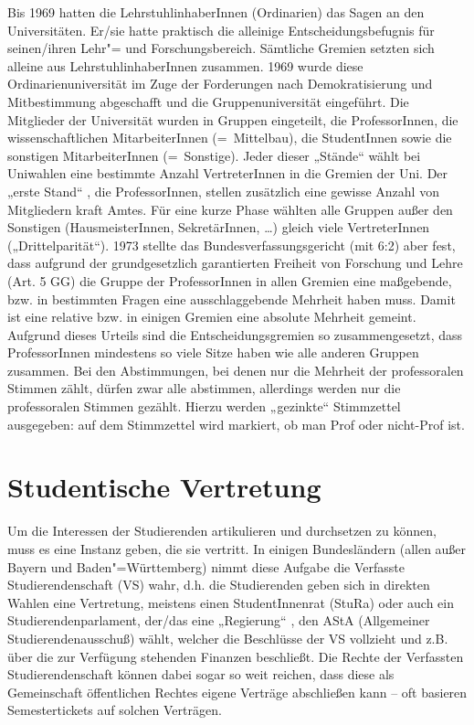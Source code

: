 Bis 1969 hatten die LehrstuhlinhaberInnen (Ordinarien) das Sagen an den
Universitäten. Er/sie hatte praktisch die alleinige Entscheidungsbefugnis
für seinen/ihren Lehr"= und Forschungsbereich. Sämtliche Gremien setzten
sich alleine aus LehrstuhlinhaberInnen zusammen. 1969 wurde diese
Ordinarienuniversität im Zuge der Forderungen nach Demokratisierung und
Mitbestimmung abgeschafft und die Gruppenuniversität eingeführt. Die
Mitglieder der Universität wurden in Gruppen eingeteilt, die
ProfessorInnen, die wissenschaftlichen MitarbeiterInnen (=\ Mittelbau), die
StudentInnen sowie die sonstigen MitarbeiterInnen (=\ Sonstige). Jeder
dieser „Stände“ wählt bei Uniwahlen eine bestimmte Anzahl VertreterInnen
in die Gremien der Uni. Der „erste Stand“ , die ProfessorInnen, stellen
zusätzlich eine gewisse Anzahl von Mitgliedern kraft Amtes. Für eine kurze
Phase wählten alle Gruppen außer den Sonstigen (HausmeisterInnen,
SekretärInnen, \dots) gleich viele VertreterInnen („Drittelparität“).
1973 stellte das Bundesverfassungsgericht (mit 6:2) aber fest, dass
aufgrund der grundgesetzlich garantierten Freiheit von Forschung und Lehre
(Art. 5 GG) die Gruppe der ProfessorInnen in allen Gremien eine
maßgebende, bzw. in bestimmten Fragen eine ausschlaggebende Mehrheit haben
muss. Damit ist eine relative bzw. in einigen Gremien eine absolute
Mehrheit gemeint. Aufgrund dieses Urteils sind die Entscheidungsgremien so
zusammengesetzt, dass ProfessorInnen mindestens so viele Sitze haben wie
alle anderen Gruppen zusammen. Bei den Abstimmungen, bei denen nur die
Mehrheit der professoralen Stimmen zählt, dürfen zwar alle abstimmen,
allerdings werden nur die professoralen Stimmen gezählt. Hierzu werden
„gezinkte“ Stimmzettel ausgegeben: auf dem Stimmzettel wird markiert, ob
man Prof oder nicht-Prof ist.



\section{Studentische Vertretung}
Um die Interessen der Studierenden artikulieren und durchsetzen zu können,
muss es eine Instanz geben, die sie vertritt. In einigen Bundesländern
(allen außer Bayern und Baden"=Württemberg) nimmt diese Aufgabe die
Verfasste Studierendenschaft (VS) wahr, d.h. die Studierenden geben sich
in direkten Wahlen eine Vertretung, meistens einen StudentInnenrat (StuRa)
oder auch ein Studierendenparlament, der/das eine „Regierung“ , den AStA
(Allgemeiner Studierendenausschuß) wählt, welcher die Beschlüsse der VS
vollzieht und z.B. über die zur Verfügung stehenden Finanzen beschließt.
Die Rechte der Verfassten Studierendenschaft können dabei sogar so weit
reichen, dass diese als Gemeinschaft öffentlichen Rechtes eigene Verträge
abschließen kann -- oft basieren Semestertickets auf solchen Verträgen.

